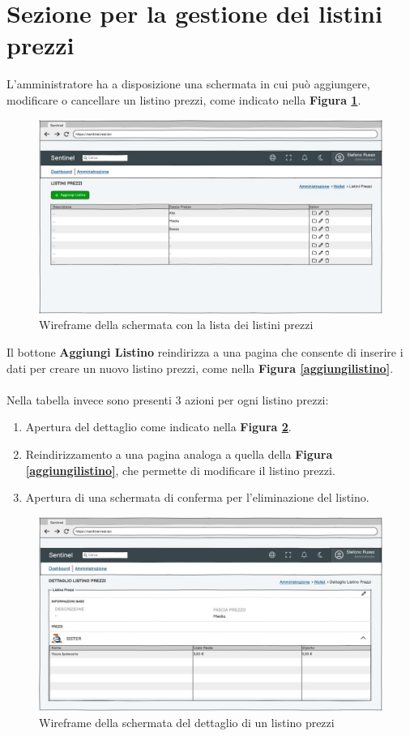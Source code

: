 \section{Sezione per la gestione dei listini prezzi}
L'amministratore ha a disposizione una schermata in cui pu\`o aggiungere, modificare o cancellare un listino prezzi, come indicato nella \textbf{Figura \ref{listalistini}}.
\begin{figure}[H]
  \centering
  \includegraphics[width=13cm]{images/gestione-listini/listini-prezzi-list.png}
  \caption{Wireframe della schermata con la lista dei listini prezzi}
  \label{listalistini}
\end{figure}
Il bottone \textbf{Aggiungi Listino} reindirizza a una pagina che consente di inserire i dati per creare un nuovo listino prezzi, come nella \textbf{Figura \ref{aggiungilistino}}.
\\\\
Nella tabella invece sono presenti 3 azioni per ogni listino prezzi:
\begin{enumerate}
  \item Apertura del dettaglio come indicato nella \textbf{Figura \ref{dettagliolistino}}.
  \item Reindirizzamento a una pagina analoga a quella della \textbf{Figura \ref{aggiungilistino}}, che permette di modificare il listino prezzi.
  \item Apertura di una schermata di conferma per l'eliminazione del listino.
\end{enumerate}

\begin{figure}[H]
  \centering
  \includegraphics[width=13cm]{images/gestione-listini/dettaglio-listino.png}
  \caption{Wireframe della schermata del dettaglio di un listino prezzi}
  \label{dettagliolistino}
\end{figure}

